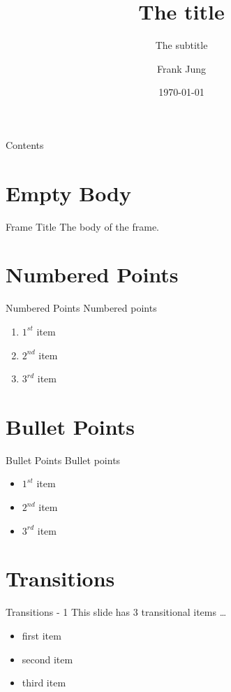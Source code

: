 \documentclass[pdf]{beamer}
\title{The title}
\subtitle{The subtitle}
\author{Frank Jung}
\institute{My Company}
\date{\today}
\begin{document}
\begin{frame}
  \titlepage{}
\end{frame}

\begin{frame}{Contents}
  \tableofcontents{}
\end{frame}

\section{Empty Body}
\begin{frame}{Frame Title}
    The body of the frame.
\end{frame}

\section{Numbered Points}
\begin{frame}{Numbered Points}
  Numbered points
  \begin{enumerate}
    \item{} $1^{st}$ item
    \item{} $2^{nd}$ item
    \item{} $3^{rd}$ item
  \end{enumerate}
\end{frame}

\section{Bullet Points}
\begin{frame}{Bullet Points}
  Bullet points
  \begin{itemize}
    \item{} $1^{st}$ item
    \item{} $2^{nd}$ item
    \item{} $3^{rd}$ item
  \end{itemize}
\end{frame}

\section{Transitions}
\begin{frame}{Transitions - 1}
  This slide has 3 transitional items \ldots
  \begin{itemize}
    \item<+-|alert@+> first item
    \item<+-|alert@+> second item
    \item<+-|alert@+> third item
  \end{itemize}
\end{frame}
\end{document}

